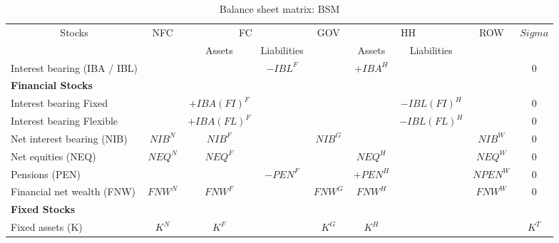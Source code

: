 \documentclass[
]{book}
\begin{document}
\begin{table}

\caption{\label{tab:sfc-fi-fl-BS}Balance sheet matrix: BSM}
\centering
\fontsize{10}{12}\selectfont
\begin{tabular}[t]{l|c|c|c|c|c|c|c|c}
\hline
\multicolumn{1}{c|}{Stocks} & \multicolumn{1}{c|}{NFC} & \multicolumn{2}{c|}{FC} & \multicolumn{1}{c|}{GOV} & \multicolumn{2}{c|}{HH} & \multicolumn{1}{c|}{ROW} & \multicolumn{1}{c}{$Sigma$} \\
\cline{1-1} \cline{2-2} \cline{3-4} \cline{5-5} \cline{6-7} \cline{8-8} \cline{9-9}
\multicolumn{1}{c|}{ } & \multicolumn{1}{c|}{ } & \multicolumn{1}{c|}{Assets} & \multicolumn{1}{c|}{Liabilities} & \multicolumn{1}{c|}{ } & \multicolumn{1}{c|}{Assets} & \multicolumn{1}{c|}{Liabilities} & \multicolumn{1}{c|}{ } & \multicolumn{1}{c}{ } \\
\cline{3-3} \cline{4-4} \cline{6-6} \cline{7-7}
Interest bearing (IBA / IBL) &  &  & $-IBL^{F}$ &  & $+IBA^{H}$ &  &  & 0\\
\hline
\multicolumn{9}{l}{\textbf{Financial Stocks}}\\
\hline
\hspace{1em}Interest bearing Fixed &  & $+IBA(FI)^{F}$ &  &  &  & $-IBL(FI)^{H}$ &  & 0\\
\hline
\hspace{1em}Interest bearing Flexible &  & $+IBA(FL)^{F}$ &  &  &  & $-IBL(FL)^{H}$ &  & 0\\
\hline
\hspace{1em}Net interest bearing (NIB) & $NIB^{N}$ & $NIB^{F}$ &  & $NIB^{G}$ &  &  & $NIB^{W}$ & 0\\
\hline
\hspace{1em}Net equities (NEQ) & $NEQ^{N}$ & $NEQ^{F}$ &  &  & $NEQ^{H}$ &  & $NEQ^{W}$ & 0\\
\hline
\hspace{1em}Pensions (PEN) &  &  & $-PEN^{F}$ &  & $+PEN^{H}$ &  & $NPEN^{W}$ & 0\\
\hline
\midrule Financial net wealth (FNW) & $FNW^{N}$ & $FNW^{F}$ &  & $FNW^{G}$ & $FNW^{H}$ &  & $FNW^{W}$ & 0\\
\hline
\multicolumn{9}{l}{\textbf{Fixed Stocks}}\\
\hline
\hspace{1em}Fixed assets (K) & $K^{N}$ & $K^{F}$ &  & $K^{G}$ & $K^{H}$ &  &  & $K^{T}$\\
\hline
\end{tabular}
\end{table}
\end{document}
